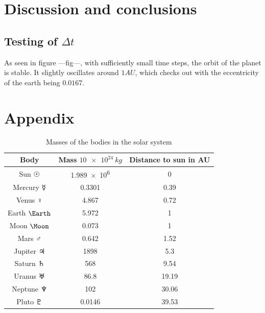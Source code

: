 \documentclass[10pt]{article}
\begin{document}
\begin{multicols}{2}
\section{Discussion and conclusions}

\subsection{Testing of $\Delta t$}
As seen in figure ---fig---, with sufficiently small time steps, the orbit of the planet is stable. It slightly oscillates around $1AU$, which checks out with the eccentricity of the earth being $0.0167$.



\section*{Appendix}
\begin{table}[H]
    \caption{Masses of the bodies in the solar system}
    \centering
    \begin{tabular}{| c | c | c | }
        \hline
        Body & Mass $\SI{10e24}{kg}$ & Distance to sun in AU\\
        \hline
        Sun      $\Sun$   & \SI{1.989e6}{}&  0 \\
        Mercury  $\Mercury$ & 0.3301    &  0.39 \\
        Venus    $\Venus$   & 4.867     &  0.72 \\
        Earth    $\Earth$   & 5.972     &  1 \\
        Moon     $\Moon$    & 0.073     &  1 \\
        Mars     $\Mars$    & 0.642     &  1.52 \\
        Jupiter  $\Jupiter$ & 1898      &  5.3 \\
        Saturn   $\Saturn$  & 568       &  9.54 \\
        Uranus   $\Uranus$  & 86.8      & 19.19 \\
        Neptune  $\Neptune$ & 102       & 30.06 \\
        Pluto    $\Pluto$   & 0.0146    & 39.53 \\
        \hline
    \end{tabular}
    \label{tab:CelestialMasses}
\end{table}


{}


\end{multicols}
\end{document}
